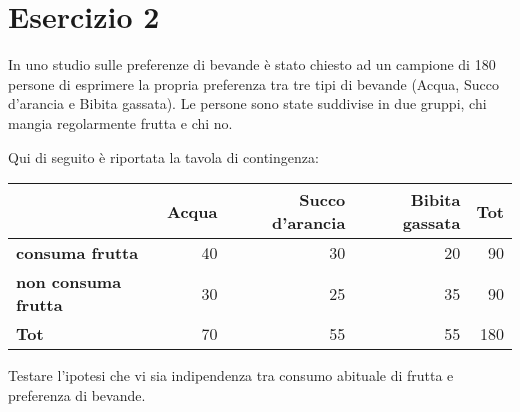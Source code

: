\documentclass[
  11pt,
]{book}
\theoremstyle{mytheoremstyle}
\theoremstyle{mydefstyle}
\begin{document}
\section{Esercizio 2}\label{esercizio-2-1}

In uno studio sulle preferenze di bevande è stato chiesto ad un campione di 180 persone di esprimere la propria preferenza tra tre tipi di bevande (Acqua, Succo d'arancia e Bibita gassata). Le persone sono state suddivise in due gruppi, chi mangia regolarmente frutta e chi no.

Qui di seguito è riportata la tavola di contingenza:

\begin{table}[H]
\centering
\begin{tabular}{>{}lrrrr}
\toprule
  & Acqua & Succo d'arancia & Bibita gassata & Tot\\
\midrule
\textbf{consuma frutta} & 40 & 30 & 20 & 90\\
\textbf{non consuma frutta} & 30 & 25 & 35 & 90\\
\textbf{Tot} & 70 & 55 & 55 & 180\\
\bottomrule
\end{tabular}
\end{table}

Testare l'ipotesi che vi sia indipendenza tra consumo abituale di frutta e preferenza di bevande.
\end{document}
